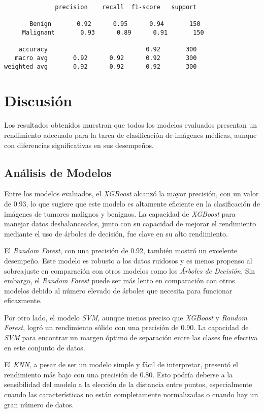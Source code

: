 \documentclass[12pt]{article}
\begin{document}
\begin{verbatim}
              precision    recall  f1-score   support

       Benign       0.92      0.95      0.94       150
     Malignant       0.93      0.89      0.91       150

    accuracy                           0.92       300
   macro avg       0.92      0.92      0.92       300
weighted avg       0.92      0.92      0.92       300
\end{verbatim}

\section{Discusión}
Los resultados obtenidos muestran que todos los modelos evaluados presentan un rendimiento adecuado para la tarea de clasificación de imágenes médicas, aunque con diferencias significativas en sus desempeños.

\subsection{Análisis de Modelos}
Entre los modelos evaluados, el \textit{XGBoost} alcanzó la mayor precisión, con un valor de 0.93, lo que sugiere que este modelo es altamente eficiente en la clasificación de imágenes de tumores malignos y benignos. La capacidad de \textit{XGBoost} para manejar datos desbalanceados, junto con su capacidad de mejorar el rendimiento mediante el uso de árboles de decisión, fue clave en su alto rendimiento.

El \textit{Random Forest}, con una precisión de 0.92, también mostró un excelente desempeño. Este modelo es robusto a los datos ruidosos y es menos propenso al sobreajuste en comparación con otros modelos como los \textit{Árboles de Decisión}. Sin embargo, el \textit{Random Forest} puede ser más lento en comparación con otros modelos debido al número elevado de árboles que necesita para funcionar eficazmente.

Por otro lado, el modelo \textit{SVM}, aunque menos preciso que \textit{XGBoost} y \textit{Random Forest}, logró un rendimiento sólido con una precisión de 0.90. La capacidad de \textit{SVM} para encontrar un margen óptimo de separación entre las clases fue efectiva en este conjunto de datos.

El \textit{KNN}, a pesar de ser un modelo simple y fácil de interpretar, presentó el rendimiento más bajo con una precisión de 0.80. Esto podría deberse a la sensibilidad del modelo a la elección de la distancia entre puntos, especialmente cuando las características no están completamente normalizadas o cuando hay un gran número de datos.
\end{document}
